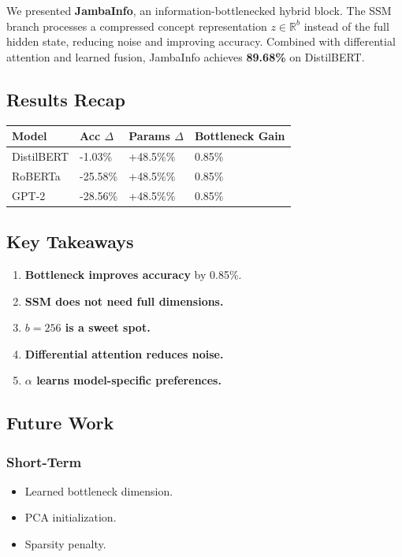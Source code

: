 We presented \textbf{JambaInfo}, an information-bottlenecked hybrid block. The 
SSM branch processes a compressed concept representation $z \in \mathbb{R}^b$ 
instead of the full hidden state, reducing noise and improving accuracy. 
Combined with differential attention and learned fusion, JambaInfo achieves 
\textbf{89.68\%} on DistilBERT.

\subsection{Results Recap}

\begin{table}[H]
\centering
\small
\begin{tabular}{llll}
\toprule
\textbf{Model} & \textbf{Acc $\Delta$} & \textbf{Params $\Delta$} & \textbf{Bottleneck Gain} \\
\midrule
DistilBERT & -1.03\% & +48.5\%\% & 0.85\% \\
RoBERTa & -25.58\% & +48.5\%\% & 0.85\% \\
GPT-2 & -28.56\% & +48.5\%\% & 0.85\% \\
\bottomrule
\end{tabular}
\end{table}

\subsection{Key Takeaways}

\begin{enumerate}
\item \textbf{Bottleneck improves accuracy} by 0.85\%.
\item \textbf{SSM does not need full dimensions.}
\item \textbf{$b = 256$ is a sweet spot.}
\item \textbf{Differential attention reduces noise.}
\item \textbf{$\alpha$ learns model-specific preferences.}

\end{enumerate}
\subsection{Future Work}

\subsubsection{Short-Term}
\begin{itemize}
\item Learned bottleneck dimension.
\item PCA initialization.
\item Sparsity penalty.

\end{itemize}
